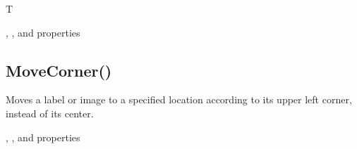 \documentclass[letterpaper,10pt,english]{sphinxmanual}
\begin{document}
\sphinxAtStartPar
{}

\begin{sphinxVerbatim}[commandchars=\\\{\}]
T
\end{sphinxVerbatim}

\sphinxAtStartPar
{}

\sphinxAtStartPar
{}, ,  and  properties

\ignorespaces 

\subsection{MoveCorner()}
\label{\detokenize{reference/utility:movecorner}}\label{\detokenize{reference/utility:index-30}}
\sphinxAtStartPar
{}

\sphinxAtStartPar
{}

\sphinxAtStartPar
Moves a label or image to a specified location          according to its upper left corner, instead of its center.

\sphinxAtStartPar
{}

\begin{sphinxVerbatim}[commandchars=\\\{\}]
\end{sphinxVerbatim}

\sphinxAtStartPar
{}

\begin{sphinxVerbatim}[commandchars=\\\{\}]
\end{sphinxVerbatim}

\sphinxAtStartPar
{}

\sphinxAtStartPar
{}, ,  and  properties
\end{document}
